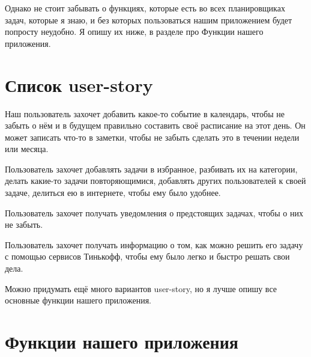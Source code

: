 \documentclass[a4paper,12pt]{article} %
\begin{document}
Однако не стоит забывать о функциях, которые есть во всех планировщиках задач, которые я знаю, и без которых пользоваться нашим приложением будет попросту неудобно. Я опишу их ниже, в разделе про Функции нашего приложения.

\section*{Список user-story}

Наш пользователь захочет добавить какое-то событие в календарь, чтобы не забыть о нём и в будущем правильно составить своё расписание на этот день. Он может записать что-то в заметки, чтобы не забыть сделать это в течении недели или месяца.

Пользователь захочет добавлять задачи в избранное, разбивать их на категории, делать какие-то задачи повторяющимися, добавлять других пользователей к своей задаче, делиться ею в интернете, чтобы ему было удобнее.

Пользователь захочет получать уведомления о предстоящих задачах, чтобы о них не забыть.

Пользователь захочет получать информацию о том, как можно решить его задачу с помощью сервисов Тинькофф, чтобы ему было легко и быстро решать свои дела. 

Можно придумать ещё много вариантов user-story, но я лучше опишу все основные функции нашего приложения.

\section*{Функции нашего приложения}
\end{document}

